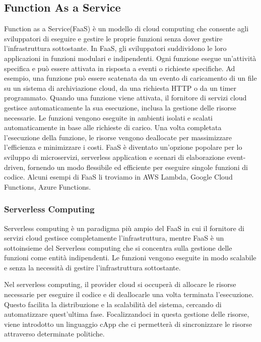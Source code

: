 \documentclass[../main.tex]{subfiles}
\begin{document}
\subsection{Function As a  Service}
Function as a Service(FaaS) è un modello di cloud computing che consente agli sviluppatori di eseguire e gestire le proprie funzioni senza dover gestire l'infrastruttura sottostante.
In FaaS, gli sviluppatori suddividono le loro applicazioni in funzioni modulari e indipendenti. Ogni funzione esegue un'attività specifica e può essere attivata in risposta a eventi o richieste specifiche. Ad esempio, una funzione può essere scatenata da un evento di caricamento di un file su un sistema di archiviazione cloud, da una richiesta HTTP o da un timer programmato. Quando una funzione viene attivata, il fornitore di servizi cloud gestisce automaticamente la sua esecuzione, inclusa la gestione delle risorse necessarie. Le funzioni vengono eseguite in ambienti isolati e scalati automaticamente in base alle richieste di carico. Una volta completata l'esecuzione della funzione, le risorse vengono deallocate per massimizzare l'efficienza e minimizzare i costi.
FaaS è diventato un'opzione popolare per lo sviluppo di microservizi, serverless application e scenari di elaborazione event-driven, fornendo un modo flessibile ed efficiente per eseguire singole funzioni di codice.
Alcuni esempi di FaaS li troviamo in AWS Lambda, Google Cloud Functions, Azure Functions.

\subsubsection{Serverless Computing}
Serverless computing è un paradigma più ampio del FaaS in cui il fornitore di servizi cloud gestisce completamente l'infrastruttura, mentre FaaS è un sottoinsieme del Serverless computing che si concentra sulla gestione delle funzioni come entità indipendenti. Le funzioni vengono eseguite in modo scalabile e senza la necessità di gestire l'infrastruttura sottostante.
\autocite{amslaurea24930}

Nel serverless computing, il provider cloud si occuperà di allocare le risorse necessarie per eseguire il codice e di deallocarle una volta terminata l'esecuzione. Questo facilita la distribuzione e la scalabilità del sistema, cercando di automatizzare quest'ultima fase.
Focalizzandoci in questa gestione delle risorse, viene introdotto un linguaggio cApp che ci permetterà di sincronizzare le risorse attraverso determinate politiche.
\end{document}
